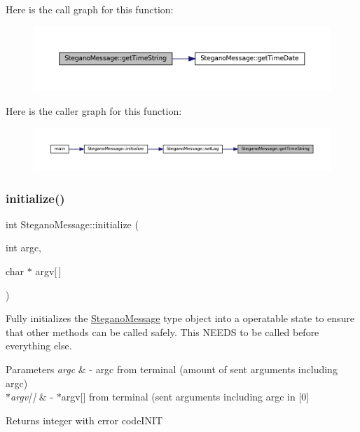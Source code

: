 Here is the call graph for this function\+:\nopagebreak
\begin{figure}[H]
\begin{center}
\leavevmode
\includegraphics[width=350pt]{classSteganoMessage_a9771a4abc2d7a5a2a8cfb1684f7f313f_cgraph}
\end{center}
\end{figure}
Here is the caller graph for this function\+:\nopagebreak
\begin{figure}[H]
\begin{center}
\leavevmode
\includegraphics[width=350pt]{classSteganoMessage_a9771a4abc2d7a5a2a8cfb1684f7f313f_icgraph}
\end{center}
\end{figure}
\mbox{\label{classSteganoMessage_aeb4d2b69498c148508e2ca70194679cc}} 
\subsubsection{\texorpdfstring{initialize()}{initialize()}}
{\footnotesize\ttfamily int Stegano\+Message\+::initialize (\begin{DoxyParamCaption}\item[{int}]{argc,  }\item[{char $\ast$}]{argv\mbox{[}$\,$\mbox{]} }\end{DoxyParamCaption})}



Fully initializes the \mbox{\hyperlink{classSteganoMessage}{Stegano\+Message}} type object into a operatable state to ensure that other methods can be called safely. This N\+E\+E\+DS to be called before everything else. 


\begin{DoxyParams}{Parameters}
{\em argc} & -\/ argc from terminal (amount of sent arguments including argc) \\
\hline
{\em $\ast$argv\mbox{[}$\,$\mbox{]}} & -\/ $\ast$argv\mbox{[}\mbox{]} from terminal (sent arguments including argc in \mbox{[}0\mbox{]} \\
\hline
\end{DoxyParams}
\begin{DoxyReturn}{Returns}
integer with error code\+I\+N\+IT 
\end{DoxyReturn}


